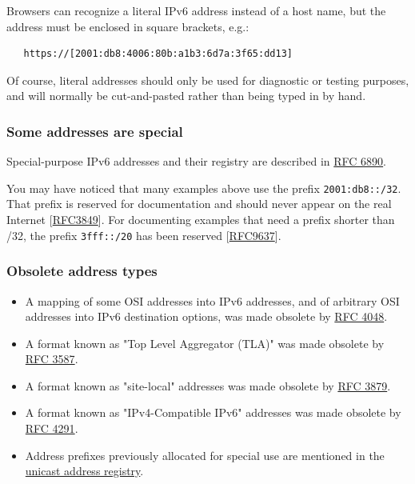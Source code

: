 \documentclass[
]{article}
\begin{document}
Browsers can recognize a literal IPv6 address instead of a host name,
but the address must be enclosed in square brackets, e.g.:

\begin{verbatim}
   https://[2001:db8:4006:80b:a1b3:6d7a:3f65:dd13]
\end{verbatim}

Of course, literal addresses should only be used for diagnostic or
testing purposes, and will normally be cut-and-pasted rather than being
typed in by hand.

\subsubsection{Some addresses are
special}\label{some-addresses-are-special}

Special-purpose IPv6 addresses and their registry are described in
\href{https://www.rfc-editor.org/info/rfc6890}{RFC 6890}.

You may have noticed that many examples above use the prefix
\texttt{2001:db8::/32}. That prefix is reserved for documentation and
should never appear on the real Internet
{[}\href{https://www.rfc-editor.org/info/rfc3849}{RFC3849}{]}. For
documenting examples that need a prefix shorter than /32, the prefix
\texttt{3fff::/20} has been reserved
{[}\href{https://www.rfc-editor.org/info/rfc9637}{RFC9637}{]}.

\subsubsection{Obsolete address types}\label{obsolete-address-types}

\begin{itemize}
\item
  A mapping of some OSI addresses into IPv6 addresses, and of arbitrary
  OSI addresses into IPv6 destination options, was made obsolete by
  \href{https://www.rfc-editor.org/info/rfc4048}{RFC 4048}.
\item
  A format known as "Top Level Aggregator (TLA)" was made obsolete by
  \href{https://www.rfc-editor.org/info/rfc3587}{RFC 3587}.
\item
  A format known as "site-local" addresses was made obsolete by
  \href{https://www.rfc-editor.org/info/rfc3879}{RFC 3879}.
\item
  A format known as "IPv4-Compatible IPv6" addresses was made obsolete
  by \href{https://www.rfc-editor.org/info/rfc4291}{RFC 4291}.
\item
  Address prefixes previously allocated for special use are mentioned in
  the
  \href{https://www.iana.org/assignments/ipv6-unicast-address-assignments/ipv6-unicast-address-assignments.xhtml}{unicast
  address registry}.
\end{itemize}
\end{document}
